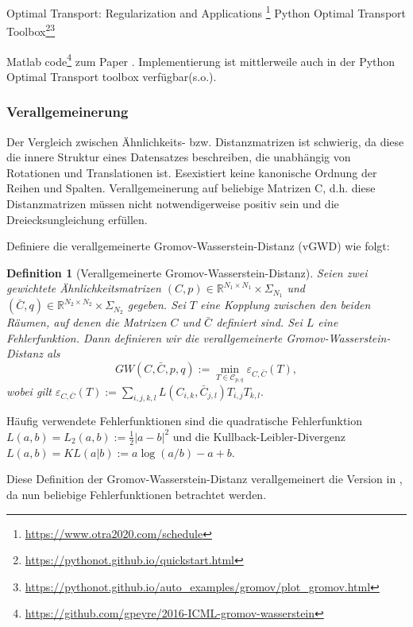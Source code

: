 \documentclass[twoside, 11pt,a4paper]{article}
\newtheorem{definition}[theorem]{Definition}
\numberwithin{equation}{section}
\begin{document}
	Optimal Transport: Regularization and Applications
	\footnote{\url{https://www.otra2020.com/schedule}}
	Python Optimal Transport Toolbox\footnote{\url{https://pythonot.github.io/quickstart.html}}\footnote{\url{https://pythonot.github.io/auto_examples/gromov/plot_gromov.html}}
	
	Matlab code\footnote{\url{https://github.com/gpeyre/2016-ICML-gromov-wasserstein}} zum Paper \cite{gwd_averaging_kernels}.
	Implementierung ist mittlerweile auch in der Python Optimal Transport toolbox verfügbar(s.o.).
	
	
	\subsubsection{Verallgemeinerung}
	Der Vergleich zwischen Ähnlichkeits- bzw. Distanzmatrizen ist schwierig, da diese die innere Struktur eines Datensatzes beschreiben, die unabhängig von Rotationen und Translationen ist. Esexistiert keine kanonische Ordnung der Reihen und Spalten.
	Verallgemeinerung auf beliebige  Matrizen C, d.h. diese Distanzmatrizen müssen nicht notwendigerweise positiv sein und die Dreiecksungleichung erfüllen.
	
	Definiere die verallgemeinerte Gromov-Wasserstein-Distanz (vGWD) wie folgt:
	
	\begin{definition}[Verallgemeinerte Gromov-Wasserstein-Distanz]
		Seien zwei gewichtete Ähnlichkeitsmatrizen $(C,p) \in \mathbb{R}^{N_1 \times N_1} \times \Sigma_{N_1}$ und $(\bar{C},q) \in \mathbb{R}^{N_2 \times N_2} \times \Sigma_{N_2}$ gegeben. Sei $T$ eine Kopplung zwischen den beiden Räumen, auf denen die Matrizen $C$ und $\bar{C}$ definiert sind. Sei $L$ eine Fehlerfunktion. Dann definieren wir die verallgemeinerte Gromov-Wasserstein-Distanz als
		\begin{equation} \label{GWD_definition}
			GW(C, \bar{C}, p, q) := \min_{T \in \mathcal{C}_{p, q}}{\mathcal{\varepsilon}_{C,\bar{C}}(T)},
		\end{equation}
		wobei gilt $\mathcal{\varepsilon}_{C,\bar{C}}(T) := \sum_{i,j,k,l}{L(C_{i,k}, \bar{C}_{j,l})T_{i,j}T_{k,l}}.$
		
	\end{definition}

	\noindent Häufig verwendete Fehlerfunktionen sind die quadratische Fehlerfunktion $L(a,b) = L_2(a,b) := \frac{1}{2}|a-b|^2$ und die Kullback-Leibler-Divergenz $L(a,b)  = KL(a|b) := a\log(a/b) -a+b$.
	
	Diese Definition der Gromov-Wasserstein-Distanz verallgemeinert die Version in \cite{gwd_averaging_kernels}, da nun beliebige Fehlerfunktionen betrachtet werden.\\
	
\end{document}
